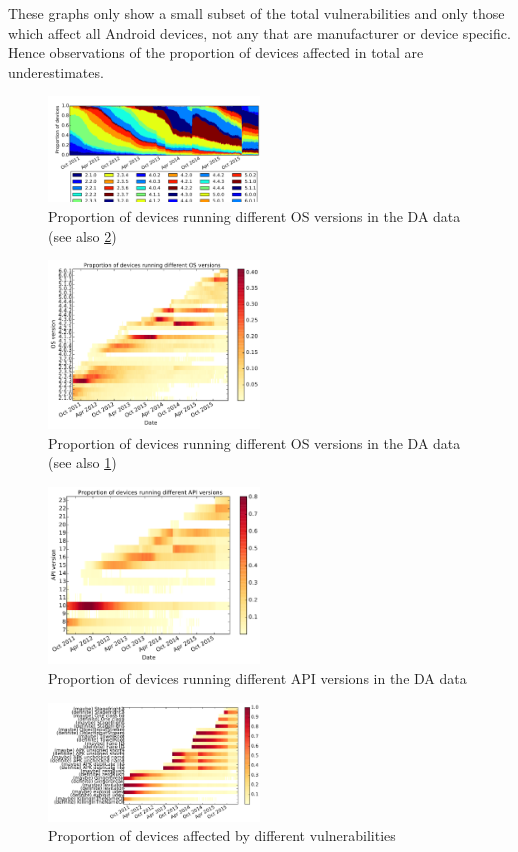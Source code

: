 \documentclass[a4paper,twocolumn]{article}
\begin{document}
These graphs only show a small subset of the total vulnerabilities and only those which affect all Android devices, not any that are manufacturer or device specific.
Hence observations of the proportion of devices affected in total are underestimates.
\begin{figure}
 \includegraphics[width=0.5\textwidth]{figures/da_norm_os.pdf}
 \caption{Proportion of devices running different OS versions in the DA data (see also \ref{fig:norm_os_heat})}
 \label{fig:da_norm_os}
\end{figure}
\begin{figure}
 \includegraphics[width=0.5\textwidth]{figures/norm_os_heat.pdf}
 \caption{Proportion of devices running different OS versions in the DA data (see also \ref{fig:da_norm_os})}
 \label{fig:norm_os_heat}
\end{figure}
\begin{figure}
 \includegraphics[width=0.5\textwidth]{figures/norm_api_heat.pdf}
 \caption{Proportion of devices running different API versions in the DA data}
 \label{fig:norm_api_heat}
\end{figure}
\begin{figure}
 \includegraphics[width=0.5\textwidth]{figures/nvulnerabilities_heat.pdf}
 \caption{Proportion of devices affected by different vulnerabilities}
 \label{fig:nvulnerabilities_heat}
\end{figure}
\end{document}
